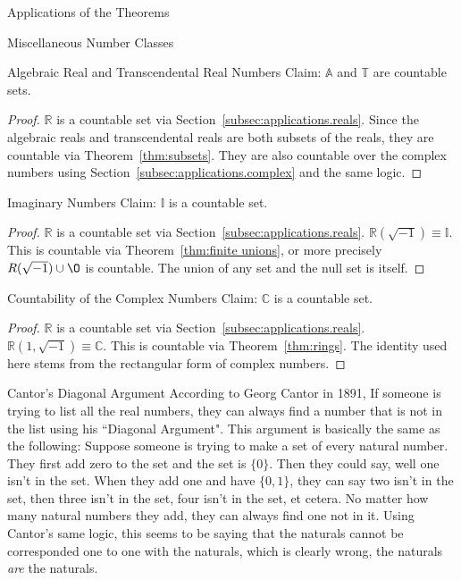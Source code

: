 \documentclass[12pt]{article}
\begin{document}
\begin{section}{Applications of the Theorems}
	\begin{subsection}{Miscellaneous Number Classes}\label{subsec:applications.miscellaneous}
		\begin{subsubsection}{Algebraic Real and Transcendental Real Numbers}
			\label{subsubsec:applications.misc.reals}
			Claim: $\mathbb A$ and $\mathbb T$ are countable sets.
			\begin{proof}
				$\mathbb R$ is a countable set via Section~\ref{subsec:applications.reals}.
				Since the algebraic reals and transcendental reals are both subsets of the
				reals, they are countable via Theorem~\ref{thm:subsets}. They are also
				countable over the complex numbers using Section~\ref{subsec:applications.complex}
				and the same logic.
			\end{proof}
		\end{subsubsection}

		\begin{subsubsection}{Imaginary Numbers}\label{subsubsec:applications.misc.imaginary}
			Claim: $\mathbb I$ is a countable set.
			\begin{proof}
				$\mathbb R$ is a countable set via Section~\ref{subsec:applications.reals}.
				$\mathbb R(\sqrt{-1})\equiv\mathbb I$. This is countable via
				Theorem~\ref{thm:finite unions}, or more precisely $R(\sqrt{-1})\cup\O$
				is countable. The union of any set and the null set is itself.
			\end{proof}
		\end{subsubsection}
	\end{subsection}

	\begin{subsection}{Countability of the Complex Numbers}\label{subsec:applications.complex}
		Claim: $\mathbb C$ is a countable set.
		\begin{proof}
			$\mathbb R$ is a countable set via Section~\ref{subsec:applications.reals}.
			$\mathbb R(1, \sqrt{-1})\equiv\mathbb C$. This is countable via Theorem~\ref{thm:rings}.
			The identity used here stems from the rectangular form of complex numbers.
		\end{proof}
	\end{subsection}
\end{section}

\begin{section}{Cantor's Diagonal Argument}\label{sec:diagonal argument}
	According to Georg Cantor in 1891, If someone is trying to list all the real numbers,
	they can always find a number that is not in the list using his ``Diagonal Argument".
	This argument is basically the same as the following: Suppose someone is trying to make
	a set of every natural number. They first add zero to the set and the set is $\{0\}$.
	Then they could say, well one isn't in the set. When they add one and have $\{0,1\}$,
	they can say two isn't in the set, then three isn't in the set, four isn't in the set,
	et cetera. No matter how many natural numbers they add, they can always find one not in
	it. Using Cantor's same logic, this seems to be saying that the naturals cannot be
	corresponded one to one with the naturals, which is clearly wrong, the naturals
	\emph{are} the naturals.
\end{section}
\end{document}
